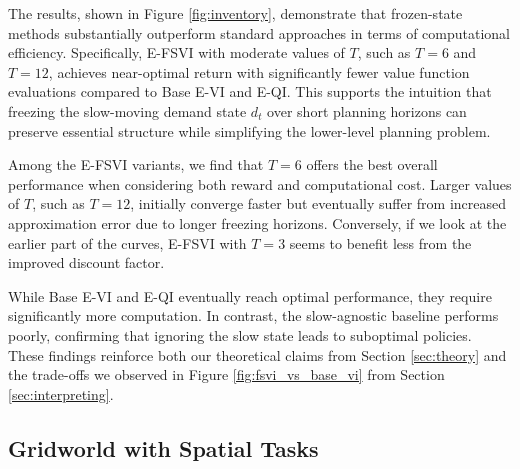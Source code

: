 \documentclass[11pt, notitlepage]{article}
\newcommand{\1}{\mathbbm{1}}
\begin{document}
The results, shown in Figure \ref{fig:inventory}, demonstrate that frozen-state methods substantially outperform standard approaches in terms of computational efficiency. Specifically, E-FSVI with moderate values of \( T \), such as \( T = 6 \) and \( T = 12 \), achieves near-optimal return with significantly fewer value function evaluations compared to Base E-VI and E-QI. This supports the intuition that freezing the slow-moving demand state \( d_t \) over short planning horizons can preserve essential structure while simplifying the lower-level planning problem.

Among the E-FSVI variants, we find that \( T = 6 \) offers the best overall performance when considering both reward and computational cost. Larger values of \( T \), such as \( T = 12 \), initially converge faster but eventually suffer from increased approximation error due to longer freezing horizons. Conversely, if we look at the earlier part of the curves, E-FSVI with \( T = 3 \) seems to benefit less from the improved discount factor.

While Base E-VI and E-QI eventually reach optimal performance, they require significantly more computation. In contrast, the slow-agnostic baseline performs poorly, confirming that ignoring the slow state leads to suboptimal policies. These findings reinforce both our theoretical claims from Section \ref{sec:theory} and the trade-offs we observed in Figure \ref{fig:fsvi_vs_base_vi} from Section \ref{sec:interpreting}.

\subsection{Gridworld with Spatial Tasks}
\end{document}
